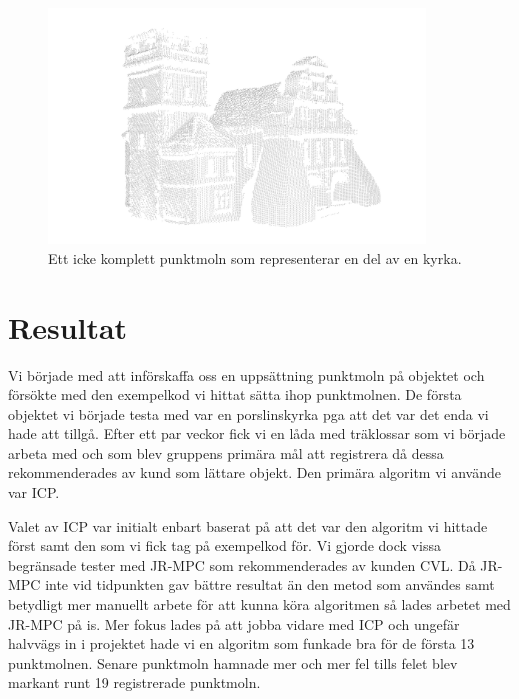 \begin{figure}[H]
	\centering
	\includegraphics[width=100mm]{figures/icke_komplett_moln_kyrka.png}
	\caption{Ett icke komplett punktmoln som representerar en del av en kyrka.}
	\label{fig:karlsson-single_scan-church}
\end{figure}


\section{Resultat}
\label{sec:results-karlsson}


Vi började med att införskaffa oss en uppsättning punktmoln på objektet och försökte med den exempelkod vi hittat sätta ihop punktmolnen. De första objektet vi började testa med var en porslinskyrka pga att det var det enda vi hade att tillgå. Efter ett par veckor fick vi en låda med träklossar som vi började arbeta med och som blev gruppens primära mål att registrera då dessa rekommenderades av kund som lättare objekt. Den primära algoritm vi använde var ICP. 

Valet av ICP var initialt enbart baserat på att det var den algoritm vi hittade först samt den som vi fick tag på exempelkod för. Vi gjorde dock vissa begränsade tester med JR-MPC som rekommenderades av kunden CVL. Då JR-MPC inte vid tidpunkten gav bättre resultat än den metod som användes samt betydligt mer manuellt arbete för att kunna köra algoritmen så lades arbetet med JR-MPC på is. Mer fokus lades på att jobba vidare med ICP och ungefär halvvägs in i projektet hade vi en algoritm som funkade bra för de första 13 punktmolnen. Senare punktmoln hamnade mer och mer fel tills felet blev markant runt 19 registrerade punktmoln. 



